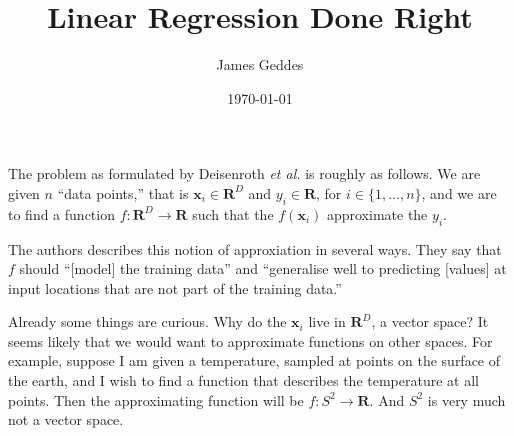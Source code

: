 \documentclass[11pt, a4paper]{article}
\author{James Geddes}
\date{\today}
\title{Linear Regression Done Right}
\begin{document}
The problem as formulated by Deisenroth \emph{et al.} is roughly as
follows. We are given \(n\) “data points,” that is
\(\mathbf{x}_i\in\mathbf{R}^D\) and \(y_i\in\mathbf{R}\), for
\(i\in\{1,\dotsc,n\}\), and we are to find a function \(f\colon
\mathbf{R}^D \to \mathbf{R}\) such that the \(f(\mathbf{x}_i)\)
approximate the \(y_i\).

The authors describes this notion of approxiation in several
ways. They say that \(f\) should “[model] the training data” and
“generalise well to predicting [values] at input locations that are
not part of the training data.”

Already some things are curious. Why do the \(\mathbf{x}_i\) live in
\(\mathbf{R}^D\), a vector space? It seems likely that we would want to
approximate functions on other spaces. For example, suppose I am given
a temperature, sampled at points on the surface of the earth, and I
wish to find a function that describes the temperature at all
points. Then the approximating function will be \(f\colon
S^2\to\mathbf{R}\). And \(S^2\) is very much not a vector space.
\end{document}
